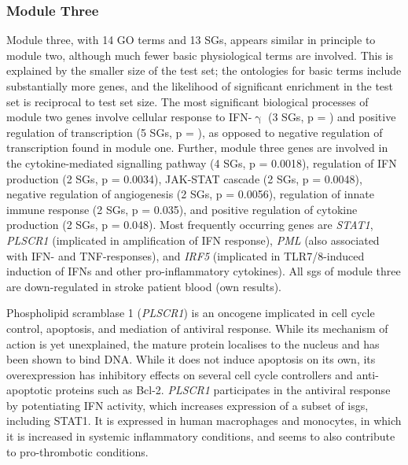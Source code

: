 \subsubsection{Module Three}
Module three, with 14 GO terms and 13 SGs, appears similar in principle to module two, although much fewer basic physiological terms are involved. This is explained by the smaller size of the test set; the ontologies for basic terms include substantially more genes, and the likelihood of significant enrichment in the test set is reciprocal to test set size. The most significant biological processes of module two genes involve cellular response to IFN-$\upgamma$ (3 SGs, p = ) and positive regulation of transcription (5 SGs, p = ), as opposed to negative regulation of transcription found in module one. Further, module three genes are involved in the cytokine-mediated signalling pathway (4 SGs, p = 0.0018), regulation of IFN production (2 SGs, p = 0.0034), JAK-STAT cascade (2 SGs, p = 0.0048), negative regulation of angiogenesis (2 SGs, p = 0.0056), regulation of innate immune response (2 SGs, p = 0.035), and positive regulation of cytokine production (2 SGs, p = 0.048). Most frequently occurring genes are \emph{STAT1}, \emph{PLSCR1} (implicated in amplification of IFN response), \emph{PML} (also associated with IFN- and TNF-responses), and \emph{IRF5} (implicated in TLR7/8-induced induction of IFNs and other pro-inflammatory cytokines). All \acp{sg} of module three are down-regulated in stroke patient blood (own results).

Phospholipid scramblase 1 (\emph{PLSCR1}) is an oncogene implicated in cell cycle control, apoptosis, and mediation of antiviral response. While its mechanism of action is yet unexplained, the mature protein localises to the nucleus and has been shown to bind DNA.\cite{Ben-Efraim2004} While it does not induce apoptosis on its own, its overexpression has inhibitory effects on several cell cycle controllers and anti-apoptotic proteins such as Bcl-2.\cite{Huang2006} \emph{PLSCR1} participates in the antiviral response by potentiating IFN activity, which increases expression of a subset of \acp{isg}, including STAT1.\cite{Dong2004} It is expressed in human macrophages and monocytes, in which it is increased in systemic inflammatory conditions, and seems to also contribute to pro-thrombotic conditions.\cite{Suzuki2010,Herate2016} 

